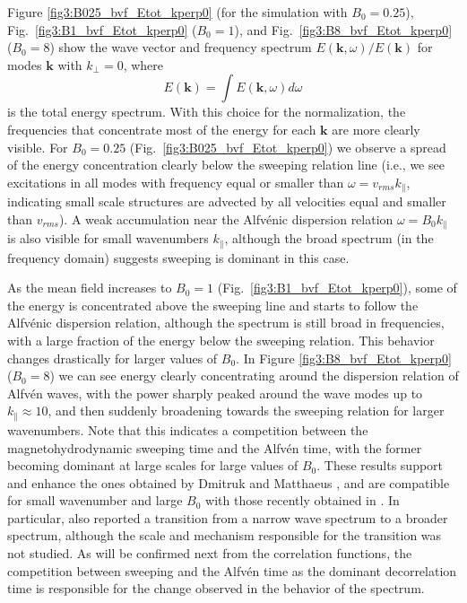 \documentclass[aip,pop,reprint,amsmath,amssymb,floatfix]{revtex4-1}
\renewcommand{\vec}[1]{\mathbf{#1}}
\begin{document}
Figure \ref{fig3:B025_bvf_Etot_kperp0} (for the simulation with
$B_0=0.25$), Fig.~\ref{fig3:B1_bvf_Etot_kperp0} ($B_0=1$), and
Fig.~\ref{fig3:B8_bvf_Etot_kperp0} ($B_0=8$) show the wave vector and
frequency spectrum $E(\vec{k}, \omega)/E(\vec{k})$ for modes $\vec{k}$ 
with $k_\perp = 0$, where
\begin{equation}
  E(\vec{k})=\int E(\vec{k},\omega)d\omega
\end{equation}
is the total energy spectrum. With this choice for the
normalization, the frequencies that concentrate most of the energy for
each $\vec{k}$ are more clearly visible. For $B_0=0.25$ 
(Fig.~\ref{fig3:B025_bvf_Etot_kperp0}) we observe a spread of the
energy concentration clearly below the sweeping relation line (i.e.,
we see excitations in all modes with frequency equal or smaller than
$\omega = v_{rms} k_\parallel$, indicating small scale structures are
advected by all velocities equal and smaller than $v_{rms}$). A weak
accumulation near the Alfv\'enic dispersion relation $\omega = B_0
k_\parallel$ is also visible for small wavenumbers $k_\parallel$,
although the broad spectrum (in the frequency domain) suggests
sweeping is dominant in this case.

As the mean field increases to $B_0=1$
(Fig.~\ref{fig3:B1_bvf_Etot_kperp0}), some of the energy is
concentrated above the sweeping line and starts to follow the
Alfv\'enic dispersion relation, although the spectrum is still broad
in frequencies, with a large fraction of the energy below the sweeping
relation. This behavior changes drastically for larger values of
$B_0$. In Figure \ref{fig3:B8_bvf_Etot_kperp0} ($B_0=8$) we can see
energy clearly concentrating around the dispersion relation of
Alfv\'en waves, with the power sharply peaked around the wave modes up
to $k_\parallel \approx 10$, and then suddenly broadening towards the
sweeping relation for larger wavenumbers. Note that this indicates a
competition between the magnetohydrodynamic sweeping time and the
Alfv\'en time, with the former becoming dominant at large scales for
large values of $B_0$. These results support and enhance the ones
obtained by Dmitruk and Matthaeus \cite{dmitruk_waves_2009}, and are
compatible for small wavenumber and large $B_0$ with those recently
obtained in \cite{meyrand_direct_2016, meyrand_weak_2015}. In
particular, \cite{meyrand_direct_2016} also reported a transition from
a narrow wave spectrum to a broader spectrum, although the scale and
mechanism responsible for the transition was not studied. As will be
confirmed next from the correlation functions, the competition between
sweeping and the Alfv\'en time as the dominant decorrelation time is
responsible for the change observed in the behavior of the spectrum.
\end{document}

